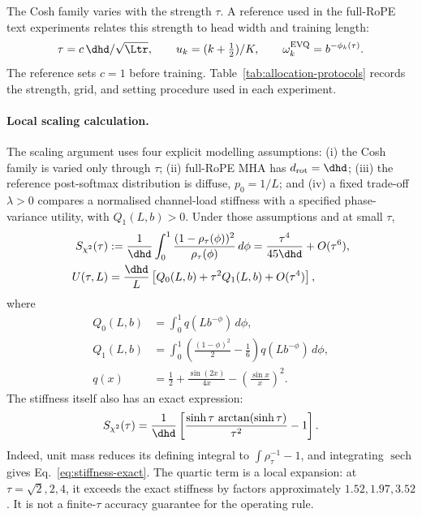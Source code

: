 The Cosh family varies with the strength $\tau$. A reference used in the
full-RoPE text experiments relates this strength to head width and training
length:
\begin{equation}
\tau = c\,\dhd/\sqrt{\Ltr},\qquad
u_k = (k+\tfrac12)/K,\qquad
\omega_k^{\mathrm{EVQ}} = b^{-\phi_k(\tau)} .
\label{eq:evq-practical}
\end{equation}
The reference sets $c=1$ before training. Table~\ref{tab:allocation-protocols}
records the strength, grid, and setting procedure used in each experiment.

\paragraph{Local scaling calculation.}
The scaling argument uses four explicit modelling assumptions: (i) the
Cosh family is varied only through $\tau$; (ii) full-RoPE MHA has
$d_{\mathrm{rot}}=\dhd$; (iii) the reference post-softmax distribution is
diffuse, $p_0=1/L$; and (iv) a fixed trade-off $\lambda>0$ compares a normalised
channel-load stiffness with a specified phase-variance utility, with
$Q_1(L,b)>0$.  Under those assumptions and at small $\tau$,
\begin{align}
S_{\chi^2}(\tau)
&:=\frac1{\dhd}\int_0^1\frac{(1-\rho_\tau(\phi))^2}{\rho_\tau(\phi)}\,d\phi
=\frac{\tau^4}{45\dhd}+O(\tau^6),\\
U(\tau,L)
&=\frac{\dhd}{L}\left[Q_0(L,b)+\tau^2Q_1(L,b)+O(\tau^4)\right],
\end{align}
where
\begin{equation}
\begin{aligned}
Q_0(L,b)&=\int_0^1 q(Lb^{-\phi})\,d\phi,\\
Q_1(L,b)&=\int_0^1\!\left(\frac{(1-\phi)^2}{2}-\frac16\right)
q(Lb^{-\phi})\,d\phi,\\
q(x)&=\frac12+\frac{\sin(2x)}{4x}
      -\left(\frac{\sin x}{x}\right)^2.
\end{aligned}
\end{equation}
The stiffness itself also has an exact expression:
\begin{equation}
S_{\chi^2}(\tau)=\frac1{\dhd}\left[\frac{\sinh\tau\,\arctan(\sinh\tau)}{\tau^2}-1\right].
\label{eq:stiffness-exact}
\end{equation}
Indeed, unit mass reduces its defining integral to $\int\rho_\tau^{-1}-1$, and integrating $\operatorname{sech}$ gives Eq.~\eqref{eq:stiffness-exact}. The quartic term is a local expansion: at $\tau=\sqrt2,2,4$, it exceeds the exact stiffness by factors approximately $1.52,1.97,3.52$. It is not a finite-$\tau$ accuracy guarantee for the operating rule.

